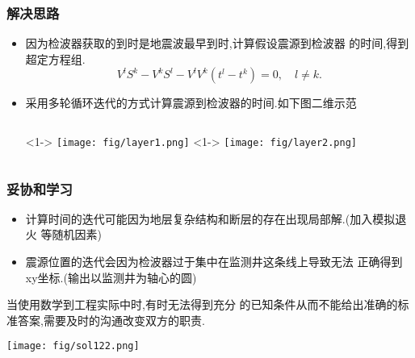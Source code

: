 \documentclass[UTF8]{ctexbeamer}	%
\theoremstyle{plain}
\theoremstyle{definition}
\theoremstyle{remark}
\numberwithin{equation}{section}
\begin{document}
\begin{frame}
    \frametitle{解决思路}
    \begin{itemize}
        \item 因为检波器获取的到时是地震波最早到时,计算假设震源到检波器
        的时间,得到超定方程组.
        \begin{equation}
            V^lS^k - V^kS^l - V^lV^k(t^l-t^k) =0, \quad l \neq k.
        \end{equation}
        \item 采用多轮循环迭代的方式计算震源到检波器的时间.如下图二维示范
        \begin{columns}
            <1->
                \texttt{[image: fig/layer1.png]}
            <1->
            \texttt{[image: fig/layer2.png]}
        \end{columns}
    \end{itemize}
\end{frame}

\begin{frame}
    \frametitle{妥协和学习}
    \begin{itemize}
        \item 计算时间的迭代可能因为地层复杂结构和断层的存在出现局部解.(加入模拟退火
        等随机因素)
        \item 震源位置的迭代会因为检波器过于集中在监测井这条线上导致无法
        正确得到xy坐标.(输出以监测井为轴心的圆)
    \end{itemize}
    当使用数学到工程实际中时,有时无法得到充分
    的已知条件从而不能给出准确的标准答案,需要及时的沟通改变双方的职责.
    \begin{center}
    \texttt{[image: fig/sol122.png]}
    \end{center}
\end{frame}
\end{document}
